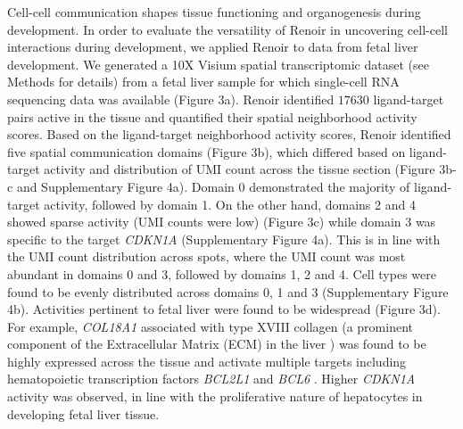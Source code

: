 Cell-cell communication shapes tissue functioning and organogenesis during development. In order to evaluate the versatility of Renoir in uncovering cell-cell interactions during development, we applied Renoir to data from fetal liver development. We generated a 10X Visium spatial transcriptomic dataset (see Methods for details) from a fetal liver sample for which single-cell RNA sequencing data was available \citep{SHARMA2020377} (Figure 3a). Renoir identified $17630$ ligand-target pairs active in the tissue and quantified their spatial neighborhood activity scores. Based on the ligand-target neighborhood activity scores, Renoir identified five spatial communication domains (Figure 3b), which differed based on ligand-target activity and distribution of UMI count across the tissue section (Figure 3b-c and Supplementary Figure 4a). Domain 0 demonstrated the majority of ligand-target activity, followed by domain 1. On the other hand, domains 2 and 4 showed sparse activity (UMI counts were low) (Figure 3c) while domain 3 was specific to the target \textit{CDKN1A} (Supplementary Figure 4a). This is in line with the UMI count distribution across spots, where the UMI count was most abundant in domains 0 and 3, followed by domains 1, 2 and 4. Cell types were found to be evenly distributed across domains 0, 1 and 3 (Supplementary Figure 4b). Activities pertinent to fetal liver were found to be widespread (Figure 3d). For example, \textit{COL18A1} associated with type XVIII collagen (a prominent component of the Extracellular Matrix (ECM) in the liver \citep{10.1242/dmm.011577}) was found to be highly expressed across the tissue and activate multiple targets including hematopoietic transcription factors \textit{BCL2L1} and \textit{BCL6} \citep{10.1371/journal.pone.0007641}. Higher \textit{CDKN1A} activity was observed, in line with the proliferative nature of hepatocytes in developing fetal liver tissue.\par
